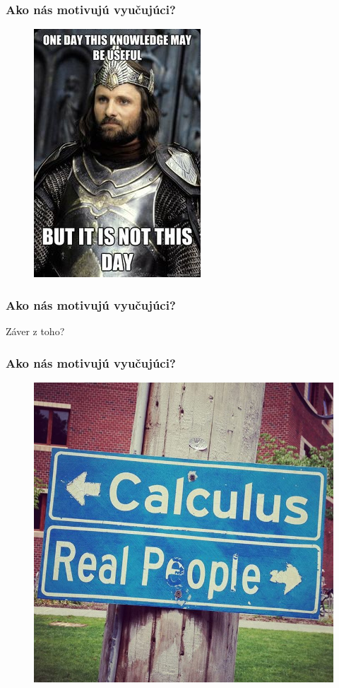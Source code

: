 \documentclass{beamer}
\begin{document}
\begin{frame}
\frametitle{Ako nás motivujú vyučujúci?}
\begin{figure}
\includegraphics[height=0.8\textheight]{images/may_be_useful.jpg}
\end{figure}
\end{frame}

\begin{frame}
\frametitle{Ako nás motivujú vyučujúci?}
\begin{center}
{\Large Záver z toho?}
\end{center}
\end{frame}

\begin{frame}
\frametitle{Ako nás motivujú vyučujúci?}
\begin{figure}
\includegraphics[height=0.8\textheight]{images/razcestnik.jpg}
\end{figure}
\end{frame}
\end{document}
